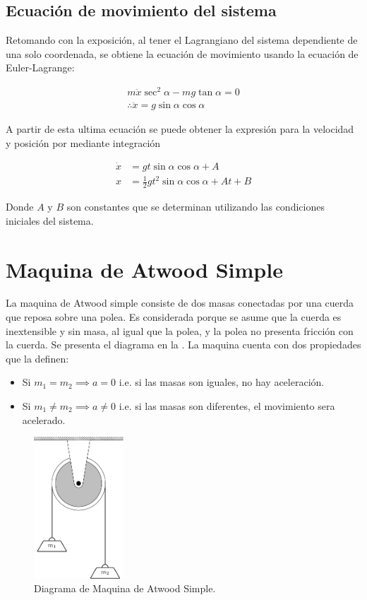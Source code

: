 \documentclass{article}
\theoremstyle{definition}
\begin{document}
\subsection{Ecuación de movimiento del sistema}
Retomando con la exposición, al tener el Lagrangiano del sistema dependiente de una solo coordenada, se obtiene la ecuación de movimiento usando la ecuación de Euler-Lagrange:

\begin{gather}
	m\ddot{x}\sec^2{\alpha} - mg\tan{\alpha} = 0 \\
	\therefore \ddot{x} = g\sin{\alpha}\cos{\alpha}
\end{gather}

A partir de esta ultima ecuación se puede obtener la expresión para la velocidad y posición por mediante integración

\begin{align}
	\dot{x} &= gt\sin{\alpha}\cos{\alpha} + A \\
	x       &= \frac{1}{2} gt^{2} \sin{\alpha}\cos{\alpha} + At + B
\end{align}

Donde $A$ y $B$ son constantes que se determinan utilizando las condiciones iniciales del sistema.

\section{Maquina de Atwood Simple}
La maquina de Atwood simple consiste de dos masas conectadas por una cuerda que reposa sobre una polea. Es considerada porque se asume que la cuerda es inextensible y sin masa, al igual que la polea, y la polea no presenta fricción con la cuerda. Se presenta el diagrama en la . La maquina cuenta con dos propiedades que la definen:

\begin{itemize}
	\item Si $m_1 = m_2 \implies a = 0$ i.e. si las masas son iguales, no hay aceleración.
	\item Si $m_1 \ne m_2 \implies a \ne 0$ i.e. si las masas son diferentes, el movimiento sera acelerado.
\end{itemize}

\begin{figure}[htbp!]
	\centering
	\includegraphics[width=0.3\textwidth]{./Images/atwood-machine.pdf}
	\caption{Diagrama de Maquina de Atwood Simple.}
	\label{fig:atwood_machine}
\end{figure}
\end{document}
